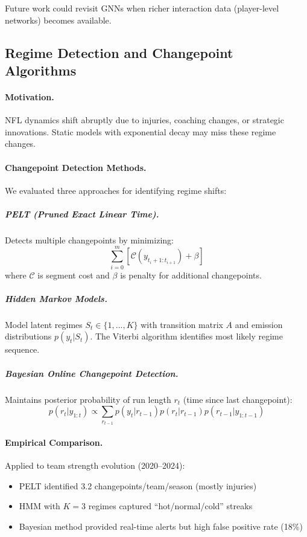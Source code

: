 Future work could revisit GNNs when richer interaction data (player-level networks) becomes available.

\subsection{Regime Detection and Changepoint Algorithms}

\paragraph{Motivation.}
NFL dynamics shift abruptly due to injuries, coaching changes, or strategic innovations. Static models with exponential decay may miss these regime changes.

\paragraph{Changepoint Detection Methods.}
We evaluated three approaches for identifying regime shifts:

\subparagraph{PELT (Pruned Exact Linear Time).}
Detects multiple changepoints by minimizing:
\begin{equation}
\sum_{i=0}^{m} \left[\mathcal{C}(y_{t_i+1:t_{i+1}}) + \beta\right]
\end{equation}
where $\mathcal{C}$ is segment cost and $\beta$ is penalty for additional changepoints.

\subparagraph{Hidden Markov Models.}
Model latent regimes $S_t \in \{1, ..., K\}$ with transition matrix $A$ and emission distributions $p(y_t|S_t)$. The Viterbi algorithm identifies most likely regime sequence.

\subparagraph{Bayesian Online Changepoint Detection.}
Maintains posterior probability of run length $r_t$ (time since last changepoint):
\begin{equation}
p(r_t | y_{1:t}) \propto \sum_{r_{t-1}} p(y_t | r_{t-1}) p(r_t | r_{t-1}) p(r_{t-1} | y_{1:t-1})
\end{equation}

\paragraph{Empirical Comparison.}
Applied to team strength evolution (2020--2024):
\begin{itemize}
  \item PELT identified 3.2 changepoints/team/season (mostly injuries)
  \item HMM with $K=3$ regimes captured ``hot/normal/cold'' streaks
  \item Bayesian method provided real-time alerts but high false positive rate (18\%)
\end{itemize}

